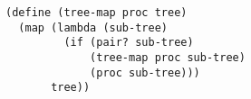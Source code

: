 \documentclass[a4paper,12pt]{article}
\begin{document}
\begin{lstlisting}
(define (tree-map proc tree)
  (map (lambda (sub-tree)
         (if (pair? sub-tree)
             (tree-map proc sub-tree)
             (proc sub-tree)))
       tree))
\end{lstlisting}
\end{document}
